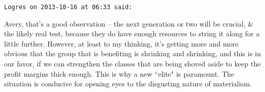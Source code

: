 \begin{footnotesize}
\begin{sffamily}
\hfill

\texttt{Logres on 2013-10-16 at 06:33 said: }

Avery, that's a good observation – the next generation or two will be crucial, \& the likely real
test, because they do have enough resources to string it along for a little further. However, at least to my thinking,
it's getting more and more obvious that the group that is benefiting is shrinking and shrinking,
and this is in our favor, if we can strengthen the classes that are being shoved aside to keep the profit margins thick
enough. This is why a new ``elite" is paramount. The situation is conducive for opening eyes to the disgusting nature of
materialism.


\hfill


\end{sffamily}\end{footnotesize}

